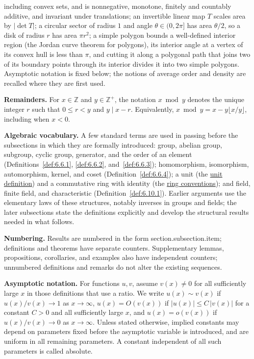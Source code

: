 \documentclass[11pt]{article}
\theoremstyle{ntstyle}
\begin{document}
\begin{itemize}
including convex sets, and is nonnegative, monotone, finitely and countably additive, and invariant under
translations; an invertible linear map $T$ scales area by $|\det T|$; a circular sector of radius $1$ and angle
$\theta\in(0,2\pi]$ has area $\theta/2$, so a disk of radius $r$ has area $\pi r^2$; a simple polygon bounds a
well-defined interior region (the Jordan curve theorem for polygons), its interior angle at a vertex of its convex
hull is less than $\pi$, and cutting it along a polygonal path that joins two of its boundary points through its
interior divides it into two simple polygons. Asymptotic notation is fixed below; the notions of average order and
density are recalled where they are first used.
\end{itemize}

\noindent \textbf{Remainders.} For $x\in\mathbb{Z}$ and $y\in\mathbb{Z}^+$, the notation $x\bmod y$ denotes the
unique integer $r$ such that $0\le r<y$ and $y\mid x-r$. Equivalently, $x\bmod y=x-y\lfloor x/y\rfloor$, including
when $x<0$.

\noindent \textbf{Algebraic vocabulary.} A few standard terms are used in passing before the subsections in which
they are formally introduced: group, abelian group, subgroup, cyclic group, generator, and the order of an element
(Definitions~\ref{def:6.6.1}, \ref{def:6.6.2}, and~\ref{def:6.6.3}); homomorphism, isomorphism, automorphism,
kernel, and coset (Definition~\ref{def:6.6.4}); a unit (the \hyperref[def:unit]{unit definition}) and a commutative
ring with identity (the \hyperref[def:rings]{ring conventions}); and field, finite field, and characteristic
(Definition~\ref{def:6.10.1}). Earlier arguments use the elementary laws of these structures, notably inverses in
groups and fields; the later subsections state the definitions explicitly and develop the structural results needed
in what follows.

\noindent \textbf{Numbering.} Results are numbered in the form section.subsection.item; definitions and theorems
have separate counters. Supplementary lemmas, propositions, corollaries, and examples also have independent
counters; unnumbered definitions and remarks do not alter the existing sequences.

\newpage


\noindent\textbf{Asymptotic notation.}\label{sec:asymptotic-notation}
For functions $u,v$, assume $v(x)\neq0$ for all sufficiently large $x$ in
those definitions that use a ratio. We write $u(x)\sim v(x)$ if
$u(x)/v(x)\to1$ as $x\to\infty$, $u(x)=O(v(x))$ if
$|u(x)|\le C\,|v(x)|$ for a constant $C>0$ and all sufficiently large $x$,
and $u(x)=o(v(x))$ if $u(x)/v(x)\to0$ as $x\to\infty$.
Unless stated otherwise, implied constants may depend on parameters fixed before
the asymptotic variable is introduced, and are uniform in all remaining
parameters. A constant independent of all such parameters is called absolute.
\end{document}
